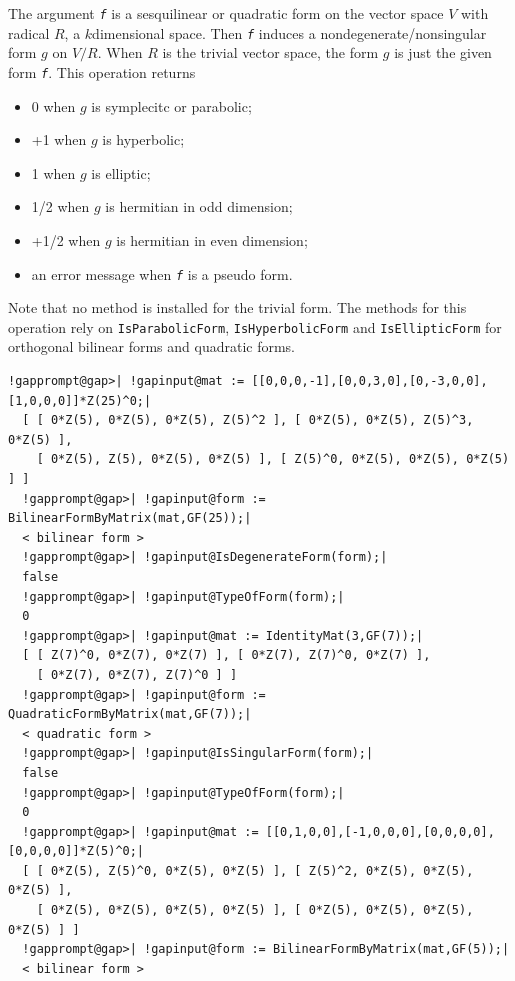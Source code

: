 \documentclass[a4paper,11pt]{report}
\begin{document}
{{{ The argument \mbox{\texttt{\mdseries\slshape f}} is a sesquilinear or quadratic form on the vector space $V$ with radical $R$, a $k$\texttt{}dimensional space. Then \mbox{\texttt{\mdseries\slshape f}} induces a non\texttt{}degenerate/non\texttt{}singular
form $g$ on $V/R$. When $R$ is the trivial vector space, the form $g$ is just the given form \mbox{\texttt{\mdseries\slshape f}}. This operation returns 
\begin{itemize}
\item 0 when $g$ is symplecitc or parabolic;
\item +1 when $g$ is hyperbolic;
\item \texttt{}1 when $g$ is elliptic;
\item \texttt{}1/2 when $g$ is hermitian in odd dimension;
\item +1/2 when $g$ is hermitian in even dimension;
\item an error message when \mbox{\texttt{\mdseries\slshape f}} is a pseudo form.
\end{itemize}
 Note that no method is installed for the trivial form. The methods for this
operation rely on \texttt{IsParabolicForm}, \texttt{IsHyperbolicForm} and \texttt{IsEllipticForm} for orthogonal bilinear forms and quadratic forms. 
\begin{Verbatim}[commandchars=!@|,fontsize=\small,frame=single,label=Example]
  !gapprompt@gap>| !gapinput@mat := [[0,0,0,-1],[0,0,3,0],[0,-3,0,0],[1,0,0,0]]*Z(25)^0;|
  [ [ 0*Z(5), 0*Z(5), 0*Z(5), Z(5)^2 ], [ 0*Z(5), 0*Z(5), Z(5)^3, 0*Z(5) ], 
    [ 0*Z(5), Z(5), 0*Z(5), 0*Z(5) ], [ Z(5)^0, 0*Z(5), 0*Z(5), 0*Z(5) ] ]
  !gapprompt@gap>| !gapinput@form := BilinearFormByMatrix(mat,GF(25));|
  < bilinear form >
  !gapprompt@gap>| !gapinput@IsDegenerateForm(form);|
  false
  !gapprompt@gap>| !gapinput@TypeOfForm(form);|
  0
  !gapprompt@gap>| !gapinput@mat := IdentityMat(3,GF(7));|
  [ [ Z(7)^0, 0*Z(7), 0*Z(7) ], [ 0*Z(7), Z(7)^0, 0*Z(7) ], 
    [ 0*Z(7), 0*Z(7), Z(7)^0 ] ]
  !gapprompt@gap>| !gapinput@form := QuadraticFormByMatrix(mat,GF(7));|
  < quadratic form >
  !gapprompt@gap>| !gapinput@IsSingularForm(form);|
  false
  !gapprompt@gap>| !gapinput@TypeOfForm(form);|
  0
  !gapprompt@gap>| !gapinput@mat := [[0,1,0,0],[-1,0,0,0],[0,0,0,0],[0,0,0,0]]*Z(5)^0;|
  [ [ 0*Z(5), Z(5)^0, 0*Z(5), 0*Z(5) ], [ Z(5)^2, 0*Z(5), 0*Z(5), 0*Z(5) ], 
    [ 0*Z(5), 0*Z(5), 0*Z(5), 0*Z(5) ], [ 0*Z(5), 0*Z(5), 0*Z(5), 0*Z(5) ] ]
  !gapprompt@gap>| !gapinput@form := BilinearFormByMatrix(mat,GF(5));|
  < bilinear form >

\end{Verbatim}}}}
\end{document}
